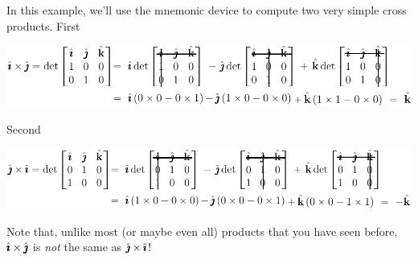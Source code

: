 \begin{eg}\label{eg:GEOcrossijji}
In this example, we'll use the mnemonic device to compute two very simple cross
products. First
      \begin{center}
      \includegraphics{detij.pdf}
      \end{center}
Second
      \begin{center}
      \includegraphics{detji.pdf}
      \end{center}
Note that, unlike most (or maybe even all) products that you have seen before, $\hat{\pmb{\imath}}\times\hat{\pmb{\jmath}}$ is \emph{not} the same as $\hat{\pmb{\jmath}}\times\hat{\pmb{\imath}}$!
\end{eg}


